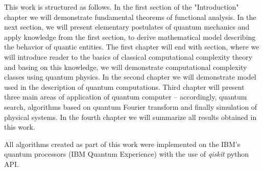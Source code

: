 This work is structured as follows. In the first section of the "Introduction" chapter we will demonstrate fundamental theorems of functional analysis. In the next section, we will present elementary postulates of quantum mechanics and apply knowledge from the first section, to derive mathematical model describing the behavior of quantic entities. The first chapter will end with section, where we will introduce reader to the basics of classical computational complexity theory and basing on this knowledge, we will demonstrate computational complexity classes using quantum physics. In the second chapter we will demonstrate model used in the description of quantum computations. Third chapter will present three main areas of application of quantum computer – accordingly, quantum search, algorithms based on quantum Fourier transform and finally simulation of physical systems. In the fourth chapter we will summarize all results obtained in this work.

All algorithms created as part of this work were implemented on the IBM's quantum processors (IBM Quantum Experience) with the use of \textit{qiskit} python API. 


